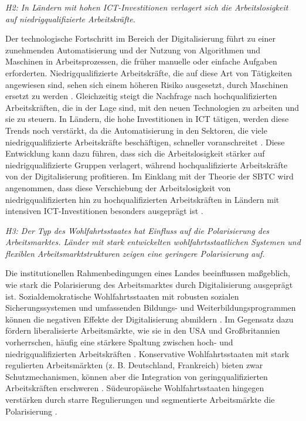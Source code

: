 \textit{H2: In Ländern mit hohen \ac{ICT}-Investitionen verlagert sich die Arbeitslosigkeit 
auf niedrigqualifizierte Arbeitskräfte.}

Der technologische Fortschritt im Bereich der Digitalisierung führt zu einer zunehmenden 
Automatisierung und der Nutzung von Algorithmen und Maschinen in Arbeitsprozessen, die früher 
manuelle oder einfache Aufgaben erforderten. Niedrigqualifizierte Arbeitskräfte, die auf 
diese Art von Tätigkeiten angewiesen sind, sehen sich einem höheren Risiko ausgesetzt, durch 
Maschinen ersetzt zu werden \parencite[S. 5–10]{autor2015whyare}. Gleichzeitig steigt die Nachfrage 
nach hochqualifizierten Arbeitskräften, die in der Lage sind, mit den neuen Technologien zu 
arbeiten und sie zu steuern. In Ländern, die hohe Investitionen in \ac{ICT} tätigen, werden 
diese Trends noch verstärkt, da die Automatisierung in den Sektoren, die viele 
niedrigqualifizierte Arbeitskräfte beschäftigen, schneller voranschreitet 
\parencite[S. 254]{frey2013thefuture}. Diese Entwicklung kann dazu führen, dass sich die 
Arbeitslosigkeit stärker auf niedrigqualifizierte Gruppen verlagert, während 
hochqualifizierte Arbeitskräfte von der Digitalisierung profitieren. Im Einklang mit der 
Theorie der \ac{SBTC} wird angenommen, dass diese Verschiebung der Arbeitslosigkeit von 
niedrigqualifizierten hin zu hochqualifizierten Arbeitskräften in Ländern mit intensiven 
\ac{ICT}-Investitionen besonders ausgeprägt ist \parencite[S. 3]{acemoglu2019robots}.

\textit{H3: Der Typ des Wohlfahrtsstaates hat Einfluss auf die Polarisierung des 
Arbeitsmarktes. Länder mit stark entwickelten wohlfahrtsstaatlichen Systemen und flexiblen 
Arbeitsmarktstrukturen zeigen eine geringere Polarisierung auf.}

Die institutionellen Rahmenbedingungen eines Landes beeinflussen maßgeblich, wie stark die 
Polarisierung des Arbeitsmarktes durch Digitalisierung ausgeprägt ist. Sozialdemokratische 
Wohlfahrtsstaaten mit robusten sozialen Sicherungssystemen und umfassenden Bildungs- und 
Weiterbildungsprogrammen können die negativen Effekte der Digitalisierung abmildern 
\parencite[S. 27f]{espingandersen1990thethree}. Im Gegensatz dazu fördern liberalisierte 
Arbeitsmärkte, wie sie in den USA und Großbritannien vorherrschen, häufig eine stärkere 
Spaltung zwischen hoch- und niedrigqualifizierten Arbeitskräften \parencite[12f]{goodin1999thereal}. 
Konservative Wohlfahrtsstaaten mit stark regulierten Arbeitsmärkten (z. B. Deutschland, 
Frankreich) bieten zwar Schutzmechanismen, können aber die Integration von 
geringqualifizierten Arbeitskräften erschweren \parencite[S. 78]{hall2001varieties}. Südeuropäische 
Wohlfahrtsstaaten hingegen verstärken durch starre Regulierungen und segmentierte 
Arbeitsmärkte die Polarisierung \parencite[S. 17–37]{ferrera1996thesouthern}.
